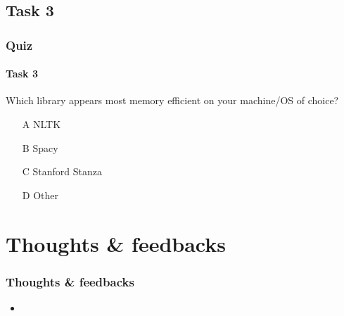 \documentclass{beamer}
\begin{document}
\subsection{Task 3}
\begin{frame}
    \frametitle{Quiz}
    \framesubtitle{Task 3}
    Which library appears most memory efficient on your machine/OS of choice?
    \begin{enumerate}
        \item[A] NLTK
        \item[B] Spacy
        \item[C] Stanford Stanza
        \item[D] Other
    \end{enumerate}
\end{frame}

\section{Thoughts \& feedbacks}
\begin{frame}
    \frametitle{Thoughts \& feedbacks}
    \begin{itemize}
        \item 
    \end{itemize}
\end{frame}
\end{document}
